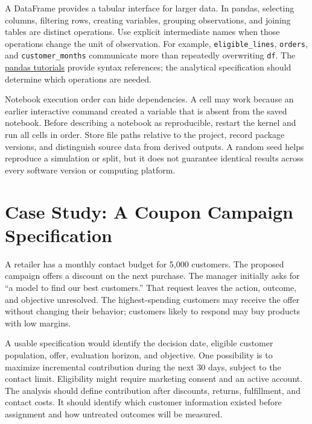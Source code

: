 A DataFrame provides a tabular interface for larger data. In pandas,
selecting columns, filtering rows, creating variables, grouping
observations, and joining tables are distinct operations. Use explicit
intermediate names when those operations change the unit of observation.
For example, \texttt{eligible\_lines}, \texttt{orders}, and
\texttt{customer\_months} communicate more than repeatedly overwriting
\texttt{df}. The
\href{https://pandas.pydata.org/docs/getting_started/intro_tutorials/}{pandas
tutorials} provide syntax references; the analytical specification
should determine which operations are needed.

Notebook execution order can hide dependencies. A cell may work because
an earlier interactive command created a variable that is absent from
the saved notebook. Before describing a notebook as reproducible,
restart the kernel and run all cells in order. Store file paths relative
to the project, record package versions, and distinguish source data
from derived outputs. A random seed helps reproduce a simulation or
split, but it does not guarantee identical results across every software
version or computing platform.

\hypertarget{M01-case-study-a-coupon-campaign-specification}{%
\section{Case Study: A Coupon Campaign
Specification}\label{M01-case-study-a-coupon-campaign-specification}}

\noindent A retailer has a monthly contact budget for 5,000 customers. The
proposed campaign offers a discount on the next purchase. The manager
initially asks for ``a model to find our best customers.'' That request
leaves the action, outcome, and objective unresolved. The
highest-spending customers may receive the offer without changing their
behavior; customers likely to respond may buy products with low margins.

A usable specification would identify the decision date, eligible
customer population, offer, evaluation horizon, and objective. One
possibility is to maximize incremental contribution during the next 30
days, subject to the contact limit. Eligibility might require marketing
consent and an active account. The analysis should define contribution
after discounts, returns, fulfillment, and contact costs. It should
identify which customer information existed before assignment and how
untreated outcomes will be measured.

